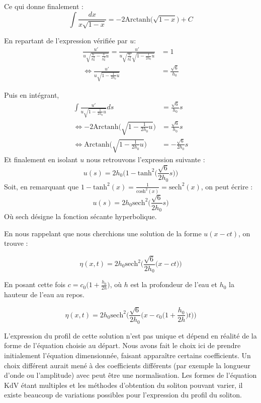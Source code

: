 Ce qui donne finalement :
$$\int \frac{dx}{x\sqrt{1 - x}} = -2\text{Arctanh}\big(\sqrt{1 - x}\big) + C$$

En repartant de l'expression vérifiée par $u$:
\begin{equation*}
\begin{split}
    \frac{u'}{u\sqrt{\frac{6}{h_0^2} - \frac{3}{h_0^3}u}} =\frac{u'}{u\sqrt{\frac{6}{h_0^2}}\sqrt{1 - \frac{1}{2h_0}u}} &= 1 \\
    \Leftrightarrow \frac{u'}{u\sqrt{1 - \frac{1}{2h_0}u}} &= \frac{\sqrt{6}}{h_0} 
\end{split}
\end{equation*}

Puis en intégrant,
\begin{equation*}
\begin{split}
    \int \frac{u'}{u\sqrt{1 - \frac{1}{2h_0}u}}ds &= \frac{\sqrt{6}}{h_0}s \\
    \Leftrightarrow -2 \text{Arctanh}\Bigg(\sqrt{1 - \frac{1}{2h_0}u} \Bigg) &= \frac{\sqrt{6}}{h_0}s \\
    \Leftrightarrow \text{Arctanh}\Bigg(\sqrt{1 - \frac{1}{2h_0}u} \Bigg) &= -\frac{\sqrt{6}}{2h_0}s
\end{split}
\end{equation*}
Et finalement en isolant $u$ nous retrouvons l'expression suivante :
$$u(s) = 2h_0\Bigg( 1 - \text{tanh}^2\bigg(\frac{\sqrt{6}}{2h_0}s\bigg) \Bigg)$$
Soit, en remarquant que $1 -\text{tanh}^2(x) = \frac{1}{\text{cosh}^2(x)} = \text{sech}^2(x)$, on peut écrire :
$$u(s) = 2h_0\text{sech}^2\bigg(\frac{\sqrt{6}}{2h_0}s\bigg)$$
Où sech désigne la fonction sécante hyperbolique.

En nous rappelant que nous cherchions une solution de la forme $u(x - ct)$, on trouve :

$$\eta(x,t) = 2h_0\text{sech}^2\bigg( \frac{\sqrt{6}}{2h_0}\Big(x - ct\Big) \bigg)$$

En posant cette fois $c = c_0\big(1 + \frac{h_0}{2h}\big)$, où $h$ est la profondeur de l'eau et $h_0$ la hauteur de l'eau au repos.

$$\eta(x,t) = 2h_0\text{sech}^2\bigg( \frac{\sqrt{6}}{2h_0}\Big(x - c_0\Big(1 + \frac{h_0}{2h}\Big)t \Big) \Bigg)$$

\begin{remarkbox}
\begin{remark}
    L'expression du profil de cette solution n'est pas unique et dépend en réalité de la forme de l'équation choisie au départ. Nous avons fait le choix ici de prendre initialement l'équation dimensionnée, faisant apparaître certains coefficients. Un choix différent aurait mené à des coefficients différents (par exemple la longueur d'onde ou l'amplitude) avec peut être une normalisation. Les formes de l'équation KdV étant multiples et les méthodes d'obtention du soliton pouvant varier, il existe beaucoup de variations possibles pour l'expression du profil du soliton. 
\end{remark}
\end{remarkbox}

